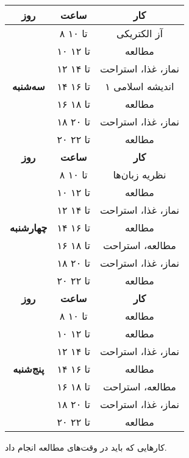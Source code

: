 \documentclass{article}
\begin{document}
\begin{center}
\begin{longtable}{|c|c|c|}
				\textbf{روز} & \textbf{ساعت} & \textbf{کار} \\
				\hline
			
				\multirow{7}{*}{\textbf{سه‌شنبه}} 				
			    & ۸ تا ۱۰ & آز الکتریکی \\
				\cline{2-3}				
				& ۱۰ تا ۱۲ & مطالعه \\
				\cline{2-3}				
				& ۱۲ تا ۱۴ & نماز، غذا، استراحت \\
				\cline{2-3}				
				& ۱۴ تا ۱۶ & اندیشه اسلامی ۱ \\
				\cline{2-3}				
				& ۱۶ تا ۱۸ & مطالعه \\
				\cline{2-3}				
				& ۱۸ تا ۲۰ & نماز، غذا، استراحت \\
				\cline{2-3}				
				& ۲۰ تا ۲۲ & مطالعه \\
		      	\hline
		      	
				\newpage
				
				\hline
				\textbf{روز} & \textbf{ساعت} & \textbf{کار} \\
				\hline
			
				\multirow{7}{*}{\textbf{چهارشنبه}} 				
			    & ۸ تا ۱۰ & نظریه زبان‌ها \\ 
			    \cline{2-3}
			    & ۱۰ تا ۱۲ & مطالعه \\
				\cline{2-3}				
				& ۱۲ تا ۱۴ & نماز، غذا، استراحت \\
				\cline{2-3}				
				& ۱۴ تا ۱۶ & مطالعه \\
				\cline{2-3}				
				& ۱۶ تا ۱۸ & مطالعه، استراحت \\
				\cline{2-3}				
				& ۱۸ تا ۲۰ & نماز، غذا، استراحت \\
				\cline{2-3}				
				& ۲۰ تا ۲۲ & مطالعه \\
				\hline \hline
				
				\textbf{روز} & \textbf{ساعت} & \textbf{کار} \\
				\hline
				
				\multirow{7}{*}{\textbf{پنج‌شنبه}} 				
				& ۸ تا ۱۰ & مطالعه \\ 
				\cline{2-3}
				& ۱۰ تا ۱۲ & مطالعه \\
				\cline{2-3}				
				& ۱۲ تا ۱۴ & نماز، غذا، استراحت \\
				\cline{2-3}				
				& ۱۴ تا ۱۶ & مطالعه \\
				\cline{2-3}				
				& ۱۶ تا ۱۸ & مطالعه، استراحت \\
				\cline{2-3}				
				& ۱۸ تا ۲۰ & نماز، غذا، استراحت \\
				\cline{2-3}				
				& ۲۰ تا ۲۲ & مطالعه \\
				\hline				
	\end{longtable}
\end{center}
\newpage
کار‌هایی که باید در وقت‌های مطالعه انجام داد.
\end{document}
